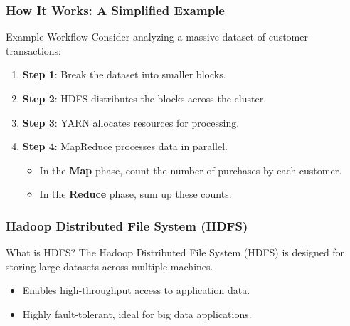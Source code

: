 \documentclass[aspectratio=169]{beamer}
\begin{document}
\begin{frame}[fragile]
    \frametitle{How It Works: A Simplified Example}
    \begin{block}{Example Workflow}
        Consider analyzing a massive dataset of customer transactions:
        \begin{enumerate}
            \item \textbf{Step 1}: Break the dataset into smaller blocks.
            \item \textbf{Step 2}: HDFS distributes the blocks across the cluster.
            \item \textbf{Step 3}: YARN allocates resources for processing.
            \item \textbf{Step 4}: MapReduce processes data in parallel.
            \begin{itemize}
                \item In the \textbf{Map} phase, count the number of purchases by each customer.
                \item In the \textbf{Reduce} phase, sum up these counts.
            \end{itemize}
        \end{enumerate}
    \end{block}
\end{frame}

\begin{frame}[fragile]
    \frametitle{Hadoop Distributed File System (HDFS)}
    \begin{block}{What is HDFS?}
        The Hadoop Distributed File System (HDFS) is designed for storing large datasets across multiple machines.
        \begin{itemize}
            \item Enables high-throughput access to application data.
            \item Highly fault-tolerant, ideal for big data applications.
        \end{itemize}
    \end{block}
\end{frame}
\end{document}
